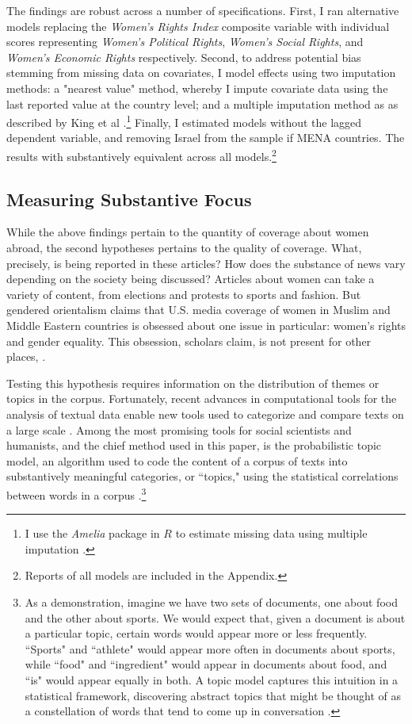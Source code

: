 \documentclass[11pt, oneside]{article}
\begin{document}
The findings are robust across a number of specifications. First, I ran alternative models replacing the \emph{Women's Rights Index} composite variable with individual scores representing \emph{Women's Political Rights}, \emph{Women's Social Rights}, and \emph{Women's Economic Rights} respectively. Second, to address potential bias stemming from missing data on covariates, I model effects using two imputation methods: a "nearest value" method, whereby I impute covariate data using the last reported value at the country level; and a multiple imputation method as as described by King et al \citeyear{king2001}.\footnote{\hspace{5} I use the \emph{Amelia} package in $R$ to estimate missing data using multiple imputation \cite{honaker2011}.} Finally, I estimated models without the lagged dependent variable, and removing Israel from the sample if MENA countries. The results with substantively equivalent across all models.\footnote{\hspace{5}Reports of all models are included in the Appendix.}

\subsection{Measuring Substantive Focus}

While the above findings pertain to the quantity of coverage about women abroad, the second hypotheses pertains to the quality of coverage. What, precisely, is being reported in these articles? How does the substance of news vary depending on the society being discussed? Articles about women can take a variety of content, from elections and protests to sports and fashion. But gendered orientalism claims that U.S. media coverage of women in Muslim and Middle Eastern countries is obsessed about one issue in particular: women's rights and gender equality. This obsession, scholars claim, is not present for other places, . 

Testing this hypothesis requires information on the distribution of themes or topics in the corpus. Fortunately, recent advances in computational tools for the analysis of textual data enable new tools used to categorize and compare texts on a large scale \cite{grimmer2013}. Among the most promising tools for social scientists and humanists, and the chief method used in this paper, is the probabilistic topic model, an algorithm used to code the content of a corpus of texts into substantively meaningful categories, or ``topics," using the statistical correlations between words in a corpus \cite{mohr2013}.\footnote{\hspace{5}As a demonstration, imagine we have two sets of documents, one about food and the other about sports. We would expect that, given a document is about a particular topic, certain words would appear more or less frequently. ``Sports" and ``athlete" would appear more often in documents about sports, while ``food" and ``ingredient" would appear in documents about food, and ``is" would appear equally in both. A topic model captures this intuition in a statistical framework, discovering abstract topics that might be thought of as a constellation of words that tend to come up in conversation \cite{mohr2013}.}
\end{document}
